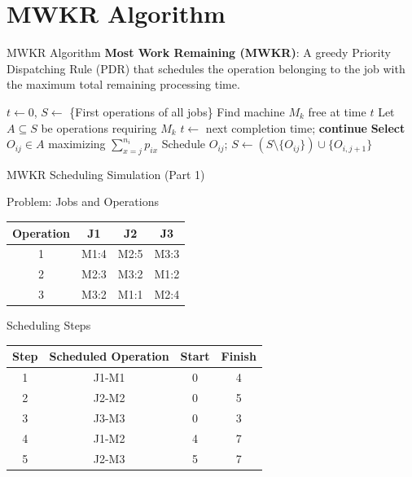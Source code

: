 \documentclass{beamer}
\begin{document}
\section{MWKR Algorithm}

\begin{frame}{MWKR Algorithm}
    \textbf{Most Work Remaining (MWKR)}: A greedy Priority Dispatching Rule (PDR) that schedules the operation belonging to the job with the maximum total remaining processing time.
    
    \vspace{0.5em}
    \scriptsize
    \begin{algorithmic}[1]
        \State $t \leftarrow 0$, $S \leftarrow$ \{First operations of all jobs\}
            \State Find machine $M_k$ free at time $t$
            \State Let $A \subseteq S$ be operations requiring $M_k$
                \State $t \leftarrow$ next completion time; \textbf{continue}
            \EndIf
            \State \textbf{Select} $O_{ij} \in A$ maximizing $\sum_{x=j}^{n_i} p_{ix}$
            \State Schedule $O_{ij}$; $S \leftarrow (S \setminus \{O_{ij}\}) \cup \{O_{i,j+1}\}$
        \EndWhile
    \end{algorithmic}
\end{frame}

\begin{frame}{MWKR Scheduling Simulation (Part 1)}
\begin{block}{Problem: Jobs and Operations}
\small
\begin{tabular}{c|ccc}
Operation & J1 & J2 & J3 \\
\hline
1 & M1:4 & M2:5 & M3:3 \\
2 & M2:3 & M3:2 & M1:2 \\
3 & M3:2 & M1:1 & M2:4 \\
\end{tabular}
\end{block}

\pause 

\begin{block}{Scheduling Steps}
\small
\begin{tabular}{c|c|c|c}
Step & Scheduled Operation & Start & Finish \\
\hline
1 & J1-M1 & 0 & 4 \\
2 & J2-M2 & 0 & 5 \\
3 & J3-M3 & 0 & 3 \\
4 & J1-M2 & 4 & 7 \\
5 & J2-M3 & 5 & 7 \\
\end{tabular}
\end{block}

\end{frame}
\end{document}
